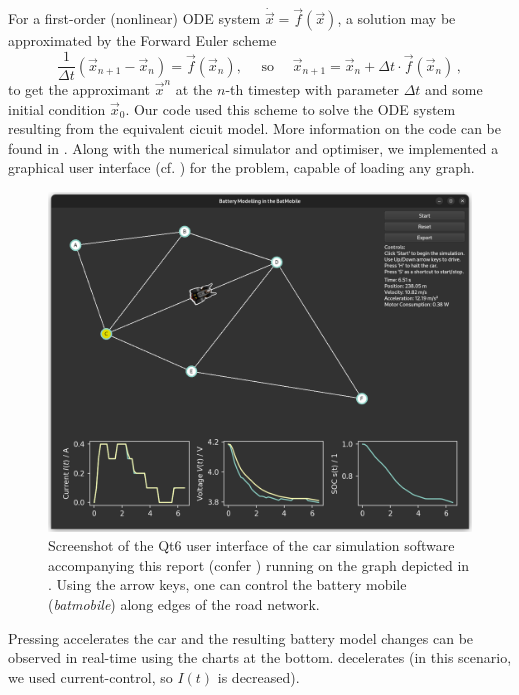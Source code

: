 \documentclass{prettytex/ox/mmsc-special-topic}
\begin{document}
  For a first-order (nonlinear) ODE system $\dot{\vec{x}} = \vec{f}(\vec{x})$, a solution may be approximated by the Forward Euler scheme
  \begin{equation}
    \frac{1}{\Delta t} \left(\vec{x}_{n+1} - \vec{x}_{n}\right) = \vec{f}(\vec{x}_n), \quad \text{ so } \quad \vec{x}_{n+1} = \vec{x}_{n} + \Delta t \cdot \vec{f}(\vec{x}_n)\,,
    \label{eq:forward-euler}
  \end{equation}
  to get the approximant $\vec{x}^n$ at the $n$-th timestep with parameter $\Delta t$ and some initial condition $\vec{x}_{0}$.
  Our code used this scheme to solve the ODE system resulting from the equivalent cicuit model. More information on the code can be found in .
  Along with the numerical simulator and optimiser, we implemented a graphical user interface (cf. ) for the problem, capable of loading any graph.

  \begin{figure}[H]
    \centering
    \includegraphics[width=0.65\linewidth]{figures/screenshot.png}
    \caption{Screenshot of the Qt6 user interface of the car simulation software accompanying this report (confer ) running on the graph depicted in . Using the arrow keys, one can control the battery mobile (\textit{batmobile}) along edges of the road network.}
    \label{fig:user-interface}
  \end{figure}

  Pressing \keys{$\uparrow$} accelerates the car and the resulting battery model changes can be observed in real-time using the charts at the bottom. \keys{$\downarrow$} decelerates (in this scenario, we used current-control, so $I(t)$ is decreased).
\end{document}
